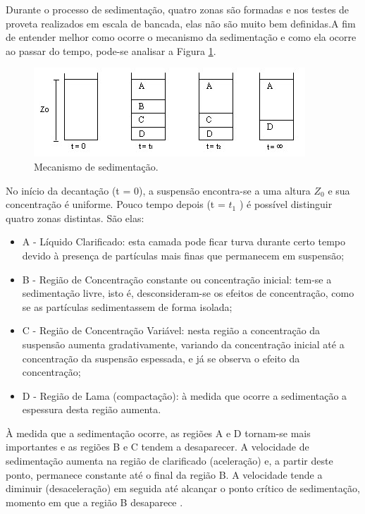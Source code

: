 Durante o processo de sedimentação, quatro zonas são formadas e nos testes de proveta realizados em escala de bancada, elas não são muito bem definidas.A fim de entender melhor como ocorre o mecanismo da sedimentação e como ela ocorre ao passar do tempo, pode-se analisar a Figura \ref{etapasprov}.


\begin{figure}[H]
	\begin{center}
		\includegraphics[scale=.8, trim={0 0 0 0}]{figuras/ladeq/sedi/proveta}
		\caption{Mecanismo de sedimentação.}
		\label{etapasprov}
	\end{center}
\end{figure}


No início da decantação (t = 0), a suspensão encontra-se a uma altura $ Z_{0} $ e sua concentração é uniforme. Pouco tempo depois (t = $ t_{1} $ ) é possível distinguir quatro zonas distintas. São elas:


\begin{itemize}
\item A - Líquido Clarificado: esta camada pode ficar turva durante certo tempo devido à presença de partículas mais finas que permanecem em suspensão;
\item B - Região de Concentração constante ou concentração inicial: tem-se a sedimentação livre, isto é, desconsideram-se os efeitos de concentração, como se as partículas sedimentassem de forma isolada;
\item C - Região de Concentração Variável: nesta região a concentração da suspensão aumenta gradativamente, variando da concentração inicial até a concentração da suspensão espessada, e já se observa o efeito da concentração;
\item D - Região de Lama (compactação): à medida que ocorre a sedimentação a espessura desta região aumenta.  
\end{itemize}

À medida que a sedimentação ocorre, as regiões A e D tornam-se mais importantes e as regiões B e C tendem a desaparecer. 
A velocidade de sedimentação aumenta na região de clarificado (aceleração) e, a partir deste ponto, permanece constante até o final da região B. A velocidade tende a diminuir (desaceleração) em seguida até alcançar o ponto crítico de sedimentação, momento em que a região B desaparece \citep{macabe}.

